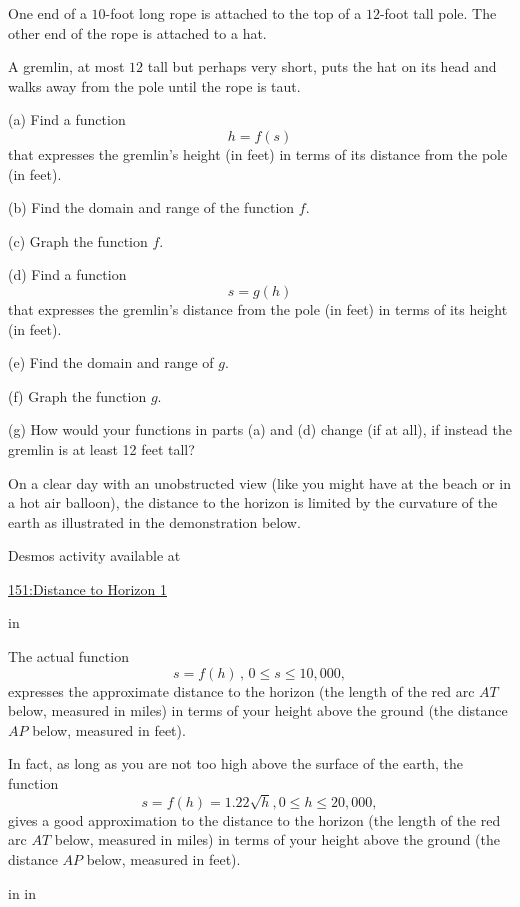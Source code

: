 \documentclass{ximera}
\newcommand{\pskip}{\vskip 0.1 in}
\begin{document}
\begin{question}  \label{Qdfsf4tnbnt}
One end of a $10$-foot long rope is attached to the top of a $12$-foot tall pole. The other end of the rope is attached to a hat.

A gremlin, at most $12$ tall but perhaps very short, puts the hat on its head and walks away from the pole until the rope is taut.

(a) Find a function
\[
      h = f(s)
\]
that expresses the gremlin's height (in feet) in terms of its distance from the pole (in feet).

(b) Find the domain and range of the function $f$.

(c) Graph the function $f$. 

(d) Find a function
\[
     s = g(h)
\]
that expresses the gremlin's distance from the pole (in feet)  in terms of its height (in feet).

(e) Find the domain and range of $g$.

(f) Graph the function $g$.

(g) How would your functions in parts (a) and (d) change (if at all), if instead the gremlin is at least 12 feet tall? 

\end{question}


\begin{question}  \label{Qdfthhrhghgr}
On a clear day with an unobstructed view (like you might have at the beach or in a hot air balloon), the distance to the horizon is limited by the curvature of the earth as illustrated in the demonstration below.

 
\begin{onlineOnly}
    \begin{center}
\end{center}
\end{onlineOnly}

Desmos activity available at

\href{https://www.desmos.com/calculator/ewowig5sgk}{151:Distance to Horizon 1}

\pskip

The actual function 
\[
        s= f(h) \, , \, 0\leq s \leq 10,000 ,
\]
expresses the approximate distance to the horizon (the length of the red arc $AT$ below, measured in miles) in terms of your height above the ground (the distance $AP$ below, measured in feet).




In fact, as long as you are not too high above the surface of the earth, the function
\[
      s = f(h) = 1.22\sqrt{h}, 0\leq h \leq 20,000,
\]
gives a good approximation to the distance to the horizon (the length of the red arc $AT$ below, measured in miles) in terms of your height above the ground (the distance $AP$ below, measured in feet).



\pskip \pskip




\end{question}
\end{document}
